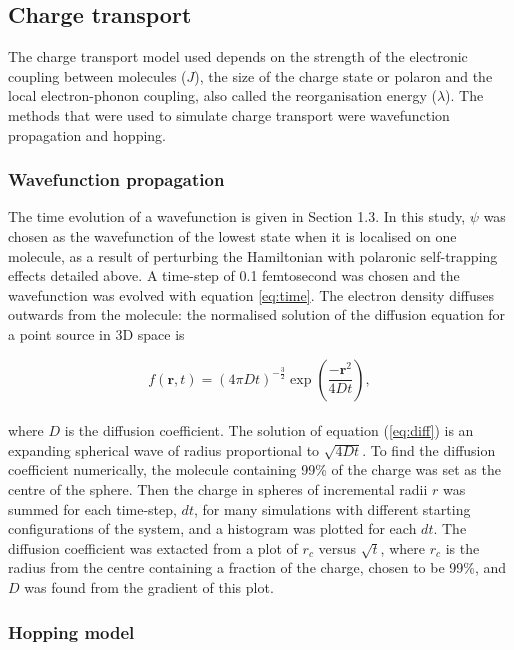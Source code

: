 \documentclass[a4paper,12pt]{article}
\begin{document}
\subsection{Charge transport}

\noindent The charge transport model used depends on the strength of the electronic coupling between molecules ($J$), the size of the charge state or polaron and the local electron-phonon coupling, also called the reorganisation energy ($\lambda$). The methods that were used to simulate charge transport were wavefunction propagation and hopping. 

\subsubsection{Wavefunction propagation} 

\noindent The time evolution of a wavefunction is given in Section 1.3. In this study, $\psi$ was chosen as the wavefunction of the lowest state when it is localised on one molecule, as a result of perturbing the Hamiltonian with polaronic self-trapping effects detailed above. A time-step of 0.1 femtosecond was chosen and the wavefunction was evolved with equation \ref{eq:time}. The electron density diffuses outwards from the molecule: the normalised solution of the diffusion equation for a point source in 3D space is \cite{Bokstein}

\begin{equation}
f(\textbf{r},t) = (4\pi Dt)^{-\frac{3}{2}} \exp \left ( \frac{-\textbf{r}^2}{4 D t} \right ),
\label{eq:diff}
\end{equation}\\

\noindent where $D$ is the diffusion coefficient. The solution of equation (\ref{eq:diff}) is an expanding spherical wave of radius proportional to $\sqrt{4Dt}$. To find the diffusion coefficient numerically, the molecule containing 99\% of the charge was set as the centre of the sphere. Then the charge in spheres of incremental radii $r$ was summed for each time-step, $dt$, for many simulations with different starting configurations of the system, and a histogram was plotted for each $dt$. The diffusion coefficient was extacted from a plot of $r_c$ versus $\sqrt{t}$, where $r_c$ is the radius from the centre containing a fraction of the charge, chosen to be 99\%, and $D$ was found from the gradient of this plot.\\ 


\subsubsection{Hopping model}
\end{document}
